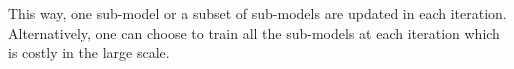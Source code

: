 \documentclass[letterpaper]{article} %
\begin{document}
This way, one sub-model or a subset of sub-models are updated in each iteration. Alternatively, one can choose to train all the sub-models at each iteration which is costly in the large scale. %




 





\end{document}

